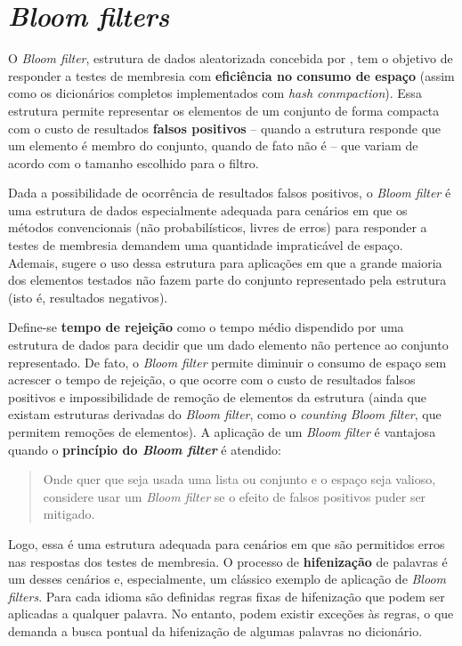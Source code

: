 \documentclass[12pt,twoside,english,brazilian]{book}
\begin{document}
\newpage

\chapter{\textit{Bloom filters}}

O \textit{Bloom filter}, estrutura de dados aleatorizada concebida por \citet{bloom}, tem o objetivo de responder a testes de membresia com \textbf{eficiência no consumo de espaço} (assim como os dicionários completos implementados com \textit{hash conmpaction}). Essa estrutura permite representar os elementos de um conjunto de forma compacta com o custo de resultados \textbf{falsos positivos} -- quando a estrutura responde que um elemento é membro do conjunto, quando de fato não é -- que variam de acordo com o tamanho escolhido para o filtro.

Dada a possibilidade de ocorrência de resultados falsos positivos, o \textit{Bloom filter} é uma estrutura de dados especialmente adequada para cenários em que os métodos convencionais (não probabilísticos, livres de erros) para responder a testes de membresia demandem uma quantidade impraticável de espaço. Ademais, \citet{bloom} sugere o uso dessa estrutura para aplicações em que a grande maioria dos elementos testados não fazem parte do conjunto representado pela estrutura (isto é, resultados negativos).

Define-se \textbf{tempo de rejeição} como o tempo médio dispendido por uma estrutura de dados para decidir que um dado elemento não pertence ao conjunto representado. De fato, o \textit{Bloom filter} permite diminuir o consumo de espaço sem acrescer o tempo de rejeição, o que ocorre com o custo de resultados falsos positivos e impossibilidade de remoção de elementos da estrutura (ainda que existam estruturas derivadas do \textit{Bloom filter}, como o \textit{counting Bloom filter}, que permitem remoções de elementos). A aplicação de um \textit{Bloom filter} é vantajosa quando o \textbf{princípio do \textit{Bloom filter}} é atendido:

\begin{quote}
Onde quer que seja usada uma lista ou conjunto e o espaço seja valioso, considere usar um \textit{Bloom filter} se o efeito de falsos positivos puder ser mitigado. \citep[tradução nossa]{broder-mitz}
\end{quote}

Logo, essa é uma estrutura adequada para cenários em que são permitidos erros nas respostas dos testes de membresia. O processo de \textbf{hifenização} de palavras é um desses cenários e, especialmente, um clássico exemplo de aplicação de \textit{Bloom filters}. Para cada idioma são definidas regras fixas de hifenização que podem ser aplicadas a qualquer palavra. No entanto, podem existir exceções às regras, o que demanda a busca pontual da hifenização de algumas palavras no dicionário.
\end{document}
